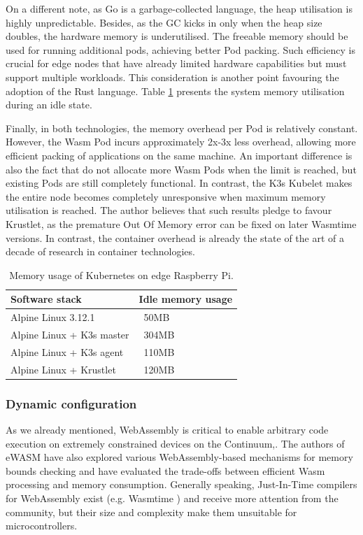 On a different note, as Go is a garbage-collected language, the heap utilisation is highly unpredictable. Besides, as the GC kicks in only when the heap size doubles, the hardware memory is underutilised. The freeable memory should be used for running additional pods, achieving better Pod packing. Such efficiency is crucial for edge nodes that have already limited hardware capabilities but must support multiple workloads. This consideration is another point favouring the adoption of the Rust language. Table \ref{tab1} presents the system memory utilisation during an idle state.

Finally, in both technologies, the memory overhead per Pod is relatively constant. However, the Wasm Pod incurs approximately 2x-3x less overhead, allowing more efficient packing of applications on the same machine. An important difference is also the fact that do not allocate more Wasm Pods when the limit is reached, but existing Pods are still completely functional. In contrast, the K3s Kubelet makes the entire node becomes completely unresponsive when maximum memory utilisation is reached. The author believes that such results pledge to favour Krustlet, as the premature Out Of Memory error can be fixed on later Wasmtime versions. In contrast, the container overhead is already the state of the art of a decade of research in container technologies.

\begin{table}\label{tab:k3s-memory-usage}
\caption{Memory usage of Kubernetes on edge Raspberry Pi.}
\begin{tabular}{|l|l|}
\hline
Software stack & Idle memory usage \\
\hline
Alpine Linux 3.12.1 & ~50MB \\
Alpine Linux + K3s master & ~304MB \\
Alpine Linux + K3s agent & ~110MB \\
Alpine Linux + Krustlet & ~120MB \\
\hline
\end{tabular}
\label{tab1}
\end{table}

\subsubsection{Dynamic configuration}

As we already mentioned, WebAssembly is critical to enable arbitrary code execution on extremely constrained devices on the Continuum,. The authors of eWASM \cite{peach2020ewasm} have also explored various WebAssembly-based mechanisms for memory bounds checking and have evaluated the trade-offs between efficient Wasm processing and memory consumption. Generally speaking, Just-In-Time compilers for WebAssembly exist (e.g. Wasmtime \cite{wasmtime}) and receive more attention from the community, but their size and complexity make them unsuitable for microcontrollers.

